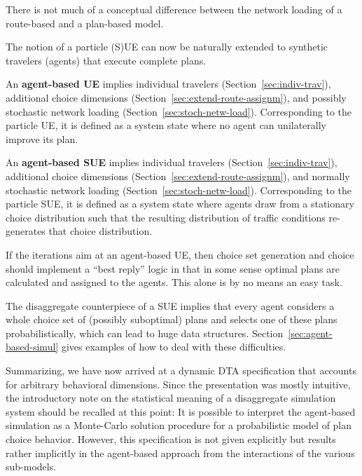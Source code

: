There is not much of a conceptual difference between the network loading of
a route-based and a plan-based model.

The notion of a particle (S)UE can now be naturally extended to synthetic travelers (agents) that execute complete plans.

An \textbf{agent-based UE} implies individual travelers
(Section~\ref{sec:indiv-trav}), additional choice dimensions
(Section~\ref{sec:extend-route-assignm}), and possibly stochastic network
loading (Section~\ref{sec:stoch-netw-load}).  Corresponding to the
particle UE, it is defined as a system state where no agent can
unilaterally improve its plan.

An \textbf{agent-based SUE} implies individual travelers
(Section~\ref{sec:indiv-trav}), additional choice dimensions
(Section~\ref{sec:extend-route-assignm}), and normally stochastic network
loading (Section~\ref{sec:stoch-netw-load}).  Corresponding to the
particle SUE, it is defined as a system state where agents draw from a
stationary choice distribution such that the resulting distribution of
traffic conditions re-generates that choice distribution.

If the iterations aim at an agent-based UE, then choice set generation
and choice should implement a ``best reply'' logic in that in some
sense optimal plans are calculated and assigned to the agents. This
alone is by no means an easy task.  

The disaggregate counterpiece of a
SUE implies that every agent considers a whole choice set of (possibly
suboptimal) plans and selects one of these plans probabilistically,
which can lead to huge data structures.
Section~\ref{sec:agent-based-simul} gives examples of how to deal with
these difficulties.

Summarizing, we have now arrived at a dynamic DTA specification that accounts for arbitrary behavioral dimensions. Since the presentation was mostly intuitive, the introductory note on the statistical meaning of a disaggregate simulation system should be recalled at this point: It is possible to interpret the agent-based simulation as a Monte-Carlo solution procedure for a probabilistic model of plan choice behavior. However, this specification is not given explicitly but results rather implicitly in the agent-based approach from the interactions of the various sub-models.

